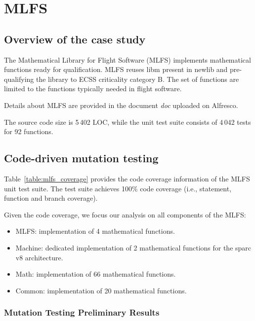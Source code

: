 \clearpage

\section{MLFS}
\label{sec:caseStudies:GSL:MLSF}

\subsection{Overview of the case study}

The Mathematical Library for Flight Software (MLFS) implements mathematical functions ready for qualification. 
MLFS reuses libm present in newlib and pre-qualifying the library to ECSS criticality category B. The set of functions are limited to the functions typically needed in flight software. 

Details about MLFS are provided in the document \emph{doc} uploaded on Alfresco.

The source code size is 5\,402 LOC, while the unit test suite consists of 4\,042 tests for 92 functions.

\subsection{Code-driven mutation testing}



Table~\ref{table:mlfs_coverage} provides the code coverage information of the MLFS unit test suite. The test suite achieves 100\% code coverage (i.e., statement, function and branch coverage).

Given the code coverage, we focus our analysis on all components of the MLFS:

\begin{itemize}
	\item MLFS: implementation of 4 mathematical functions.
	\item Machine: dedicated implementation of 2 mathematical functions for the sparc v8 architecture.
	\item Math: implementation of 66 mathematical functions.
	\item Common: implementation of 20 mathematical functions.
\end{itemize}

\subsubsection{Mutation Testing Preliminary Results}


